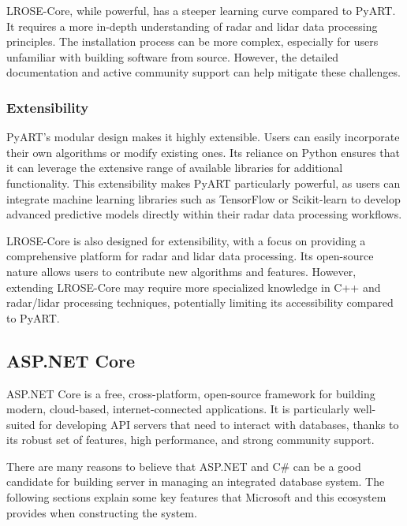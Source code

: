 LROSE-Core, while powerful, has a steeper learning curve compared to PyART. It
requires a more in-depth understanding of radar and lidar data processing
principles. The installation process can be more complex, especially for users
unfamiliar with building software from source. However, the detailed
documentation and active community support can help mitigate these challenges.

\subsubsection{Extensibility}
PyART's modular design makes it highly extensible. Users can easily incorporate
their own algorithms or modify existing ones. Its reliance on Python ensures
that it can leverage the extensive range of available libraries for additional
functionality. This extensibility makes PyART particularly powerful, as users
can integrate machine learning libraries such as TensorFlow or Scikit-learn to
develop advanced predictive models directly within their radar data processing
workflows.

LROSE-Core is also designed for extensibility, with a focus on providing a
comprehensive platform for radar and lidar data processing. Its open-source
nature allows users to contribute new algorithms and features. However,
extending LROSE-Core may require more specialized knowledge in C++ and
radar/lidar processing techniques, potentially limiting its accessibility
compared to PyART.


\subsection{ASP.NET Core}
ASP.NET Core is a free, cross-platform, open-source framework for building
modern, cloud-based, internet-connected applications. It is particularly
well-suited for developing API servers that need to interact with databases,
thanks to its robust set of features, high performance, and strong community
support.

There are many reasons to believe that ASP.NET and C\# can be a good candidate
for building server in managing an integrated database system. The following
sections explain some key features that Microsoft and this ecosystem provides
when constructing the system.

